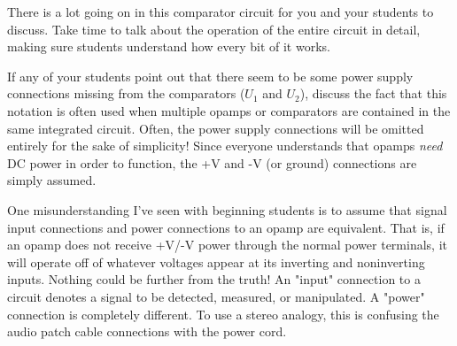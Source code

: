 
There is a lot going on in this comparator circuit for you and your students to discuss.  Take time to talk about the operation of the entire circuit in detail, making sure students understand how every bit of it works.

If any of your students point out that there seem to be some power supply connections missing from the comparators ($U_1$ and $U_2$), discuss the fact that this notation is often used when multiple opamps or comparators are contained in the same integrated circuit.  Often, the power supply connections will be omitted entirely for the sake of simplicity!  Since everyone understands that opamps {\it need} DC power in order to function, the +V and -V (or ground) connections are simply assumed.

One misunderstanding I've seen with beginning students is to assume that signal input connections and power connections to an opamp are equivalent.  That is, if an opamp does not receive +V/-V power through the normal power terminals, it will operate off of whatever voltages appear at its inverting and noninverting inputs.  Nothing could be further from the truth!  An "input" connection to a circuit denotes a signal to be detected, measured, or manipulated.  A "power" connection is completely different.  To use a stereo analogy, this is confusing the audio patch cable connections with the power cord.




